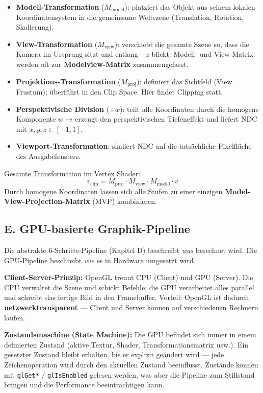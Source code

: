\documentclass[12pt, a4paper]{article}
\begin{document}
\begin{itemize}
  \item \textbf{Modell-Transformation} ($M_\text{model}$): platziert das Objekt aus seinem lokalen Koordinatensystem in die gemeinsame Weltszene (Translation, Rotation, Skalierung).
  \item \textbf{View-Transformation} ($M_\text{view}$): verschiebt die gesamte Szene so, dass die Kamera im Ursprung sitzt und entlang $-z$ blickt. Modell- und View-Matrix werden oft zur \textbf{Modelview-Matrix} zusammengefasst.
  \item \textbf{Projektions-Transformation} ($M_\text{proj}$): definiert das Sichtfeld (View Frustum); überführt in den Clip Space. Hier findet Clipping statt.
  \item \textbf{Perspektivische Division} ($\div w$): teilt alle Koordinaten durch die homogene Komponente $w$ → erzeugt den perspektivischen Tiefeneffekt und liefert NDC mit $x,y,z \in [-1,1]$.
  \item \textbf{Viewport-Transformation}: skaliert NDC auf die tatsächliche Pixelfläche des Ausgabefensters.
\end{itemize}

Gesamte Transformation im Vertex Shader:
\[
  v_\text{clip} = M_\text{proj} \cdot M_\text{view} \cdot M_\text{model} \cdot v
\]
Durch homogene Koordinaten lassen sich alle Stufen zu einer einzigen \textbf{Model-View-Projection-Matrix} (MVP) kombinieren.

\subsection*{E. GPU-basierte Graphik-Pipeline}

Die abstrakte 6-Schritte-Pipeline (Kapitel D) beschreibt \textit{was} berechnet wird. Die GPU-Pipeline beschreibt \textit{wie} es in Hardware umgesetzt wird.

\textbf{Client-Server-Prinzip:} OpenGL trennt CPU (Client) und GPU (Server). Die CPU verwaltet die Szene und schickt Befehle; die GPU verarbeitet alles parallel und schreibt das fertige Bild in den Framebuffer. Vorteil: OpenGL ist dadurch \textbf{netzwerktransparent} — Client und Server können auf verschiedenen Rechnern laufen.

\medskip
\textbf{Zustandsmaschine (State Machine):} Die GPU befindet sich immer in einem definierten Zustand (aktive Textur, Shader, Transformationsmatrix usw.). Ein gesetzter Zustand bleibt erhalten, bis er explizit geändert wird — jede Zeichenoperation wird durch den aktuellen Zustand beeinflusst. Zustände können mit \texttt{glGet*} / \texttt{glIsEnabled} gelesen werden, was aber die Pipeline zum Stillstand bringen und die Performance beeinträchtigen kann.
\end{document}
